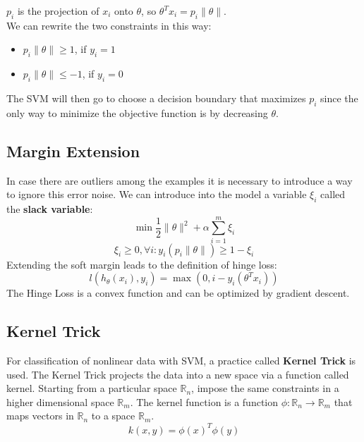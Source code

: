 $p_i$ is the projection of $x_i$ onto $\theta$, so $\theta^Tx_i = p_i\|\theta\|$. \\
We can rewrite the two constraints in this way:
\begin{itemize}
    \item $p_i\|\theta\| \geq 1$, if $y_i = 1$
    \item $p_i\|\theta\| \leq -1$, if $y_i = 0$
\end{itemize}
The SVM will then go to choose a decision boundary that maximizes $p_i$ since the only way to minimize the objective function is by decreasing $\theta$.

\newpage
\subsection{Margin Extension}
In case there are outliers among the examples it is necessary to introduce a way to ignore this error noise.  We can introduce into the model a variable $\xi_i$ called the \textbf{slack variable}:
\begin{equation} \tag*{}
    \min \frac{1}{2} \|\theta\|^2 + \alpha \sum^m_{i=1} \xi_i
\end{equation}
\begin{equation} \tag*{}
    \xi_i \geq 0, \forall i:y_i(p_i\|\theta\|) \geq 1 - \xi_i
\end{equation}
Extending the soft margin leads to the definition of hinge loss:
\begin{equation} \tag*{}
    l(h_\theta(x_i),y_i) = \max (0,i - y_i(\theta^Tx_i))
\end{equation}
The Hinge Loss is a convex function and can be optimized by gradient descent.

\subsection{Kernel Trick}
For classification of nonlinear data with SVM, a practice called \textbf{Kernel Trick} is used. The Kernel Trick projects the data into a new space via a function called kernel. Starting from a particular space $\mathbb{R}_n$, impose the same constraints in a higher dimensional space $\mathbb{R}_m$. The kernel function is a function $\phi:\mathbb{R}_n \rightarrow \mathbb{R}_m$ that maps vectors in $\mathbb{R}_n$ to a space $\mathbb{R}_m$.
\begin{equation} \tag*{}
    k(x,y) = \phi(x)^T \phi(y)
\end{equation}

\newpage